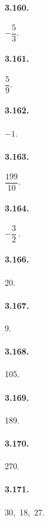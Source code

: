 \begin{multicols}{3}

\paragraph{3.160.}
$-\dfrac{5}{3}$.

\paragraph{3.161.}
$\dfrac{5}{9}$.

\paragraph{3.162.}
$-1$.

\paragraph{3.163.}
$\dfrac{199}{10}$.

\paragraph{3.164.}
$-\dfrac{3}{2}~$.

\paragraph{3.166.} 20.

\paragraph{3.167.} 9.

\paragraph{3.168.} 105.

\paragraph{3.169.} 189.

\paragraph{3.170.} 270.

\paragraph{3.171.} 30,~18,~27.


\end{multicols}
